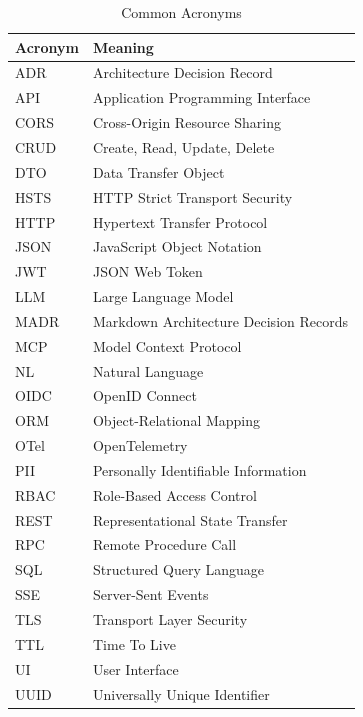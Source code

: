 \begin{table}[ht]
\centering
\caption{Common Acronyms}
\label{tab:acronyms}
\small
\begin{tabularx}{\textwidth}{lX}
    \hline
    \textbf{Acronym} & \textbf{Meaning} \\
    \hline
    ADR & Architecture Decision Record \\
    API & Application Programming Interface \\
    CORS & Cross-Origin Resource Sharing \\
    CRUD & Create, Read, Update, Delete \\
    DTO & Data Transfer Object \\
    HSTS & HTTP Strict Transport Security \\
    HTTP & Hypertext Transfer Protocol \\
    JSON & JavaScript Object Notation \\
    JWT & JSON Web Token \\
    LLM & Large Language Model \\
    MADR & Markdown Architecture Decision Records \\
    MCP & Model Context Protocol \\
    NL & Natural Language \\
    OIDC & OpenID Connect \\
    ORM & Object-Relational Mapping \\
    OTel & OpenTelemetry \\
    PII & Personally Identifiable Information \\
    RBAC & Role-Based Access Control \\
    REST & Representational State Transfer \\
    RPC & Remote Procedure Call \\
    SQL & Structured Query Language \\
    SSE & Server-Sent Events \\
    TLS & Transport Layer Security \\
    TTL & Time To Live \\
    UI & User Interface \\
    UUID & Universally Unique Identifier \\
    \hline
\end{tabularx}
\end{table}

